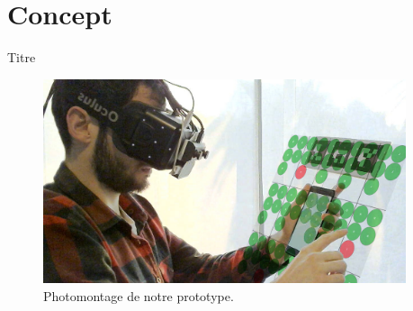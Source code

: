 \section{Concept} %
\begin{frame}{Titre}
  \begin{figure}
    \includegraphics[height=6cm]{figures/HandheldVESADMidAirInArOut}
    \caption{Photomontage de notre prototype.}
  \end{figure}
\end{frame}